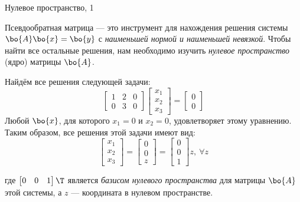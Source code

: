 \documentclass{beamer}
\begin{document}
\begin{frame}{Нулевое пространство, 1}
	\begin{flushleft}
		{\small
		Псевдообратная матрица — это инструмент для нахождения решения системы $\bo{A}\bo{x} = \bo{y}$ с \emph{наименьшей нормой и наименьшей невязкой}. Чтобы найти все остальные решения, нам необходимо изучить \emph{нулевое пространство} (ядро) матрицы $\bo{A}$.
		
		Найдём все решения следующей задачи:
		\begin{equation}
			\begin{bmatrix}
				1 & 2 & 0 \\ 0 & 3 & 0
			\end{bmatrix}
			\begin{bmatrix}
				x_1 \\ x_2 \\ x_3
			\end{bmatrix}
			=
			\begin{bmatrix}
				0 \\ 0
			\end{bmatrix}
		\end{equation}
		Любой $\bo{x}$, для которого $x_1 = 0$ и $x_2 = 0$, удовлетворяет этому уравнению. Таким образом, все решения этой задачи имеют вид:
		\begin{equation}
			\begin{bmatrix}
				x_1 \\ x_2 \\ x_3
			\end{bmatrix}
			=
			\begin{bmatrix}
				0 \\ 0 \\ z
			\end{bmatrix}
			=
			\begin{bmatrix}
				0 \\ 0 \\ 1
			\end{bmatrix}
			z, \ \forall z
		\end{equation}
		
		где $\begin{bmatrix}
			0 & 0 & 1
		\end{bmatrix}\T$ является \emph{базисом нулевого пространства} для матрицы $\bo{A}$ этой системы, а $z$ — координата в нулевом пространстве.
		}
	\end{flushleft}
\end{frame}
\end{document}

